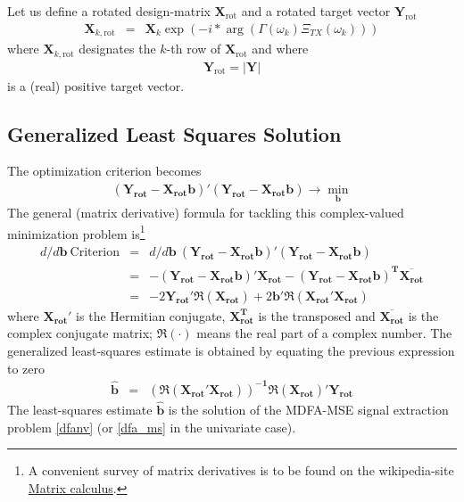 \documentclass[a4paper]{book}
\begin{document}
Let us define a rotated design-matrix $\mathbf{X}_{\textrm{rot}}$ and a rotated target vector $\mathbf{Y}_{\textrm{rot}}$
\begin{eqnarray}\label{desmatrot}
\mathbf{X}_{k,\textrm{rot}}&=&\mathbf{X}_k \exp\left(-i*\arg\left(\Gamma(\omega_k)\Xi_{TX}(\omega_k)\right)\right)
\end{eqnarray}
where $\mathbf{X}_{k,\textrm{rot}}$ designates the $k$-th row of $\mathbf{X}_{\textrm{rot}}$ and where
\begin{eqnarray}\label{desmatrot_y}
 \mathbf{Y}_{\textrm{rot}}=\left|\mathbf{Y}\right|
\end{eqnarray}
is a (real) positive target vector. 



\subsection{Generalized Least Squares Solution}\label{gen_le_sq_sol}

The optimization criterion becomes
\begin{eqnarray}\label{regms}
(\mathbf{Y_{\textrm{rot}}-X_{\textrm{rot}}b})'(\mathbf{Y_{\textrm{rot}}-X_{\textrm{rot}}b})\to\min_{\mathbf{b}}
\end{eqnarray}
The general (matrix derivative) formula for tackling this complex-valued minimization problem is\footnote{A convenient survey of matrix derivatives is to be found on the wikipedia-site \href{http://en.wikipedia.org/wiki/Matrix_calculus}{Matrix calculus}.}
\begin{eqnarray}\label{least_squares_b}
d/d\mathbf{b}~\textrm{Criterion}&=&d/d\mathbf{b}~ (\mathbf{Y_{\textrm{rot}}-X_{\textrm{rot}}b})'(\mathbf{Y_{\textrm{rot}}-X_{\textrm{rot}}b})\\
&=&-\mathbf{(Y_{\textrm{rot}}-X_{\textrm{rot}}b)'X_{\textrm{rot}}}-\mathbf{(Y_{\textrm{rot}}-X_{\textrm{rot}}b)^T\overline{X_{\textrm{rot}}}}\nonumber\\
&=&-2\mathbf{Y_{\textrm{rot}}'\Re\left(X_{\textrm{rot}}\right)}+2\mathbf{b'\Re(X_{\textrm{rot}}'X_{\textrm{rot}})}\nonumber
\end{eqnarray}
where  $\mathbf{X_{\textrm{rot}}}'$ is the Hermitian conjugate, $\mathbf{X_{\textrm{rot}}^T}$ is the transposed and $\overline{\mathbf{X_{\textrm{rot}}}}$ is the complex conjugate matrix;   $\Re\left(\cdot\right)$ means the real part of a complex number. The generalized least-squares estimate is obtained by equating the previous expression to zero
\begin{eqnarray}\label{bregms}
\mathbf{\hat{b}}&=&\mathbf{\left(\Re(X_{\textrm{rot}}'X_{\textrm{rot}})\right)^{-1}\Re(X_{\textrm{rot}})'Y_{\textrm{rot}}}
\end{eqnarray}
The least-squares estimate $\mathbf{\hat{b}}$ is the solution of the MDFA-MSE signal extraction problem \ref{dfanv} (or \ref{dfa_ms} in the univariate case).
\end{document}
